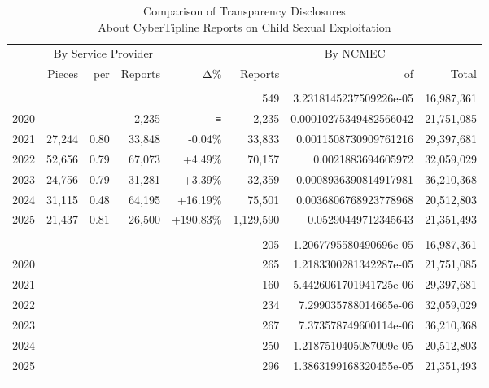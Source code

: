 \begin{table}[!t]
\caption*{
{\large Comparison of Transparency Disclosures} \\
{\small About CyberTipline Reports on Child Sexual Exploitation}
} 

\fontsize{12.0pt}{14.4pt}\selectfont

\begin{tabular*}{\linewidth}{@{\extracolsep{\fill}}l|rrrrrrr}
\toprule
  & \multicolumn{3}{c}{By Service Provider} &  & \multicolumn{3}{c}{By NCMEC} \\ 
\cmidrule(lr){2-4} \cmidrule(lr){6-8}
  & Pieces & per & Reports & Δ\% & Reports & of & Total \\ 
\midrule\addlinespace[2.5pt]
\multicolumn{8}{l}{Amazon} \\[2.5pt] 
\midrule\addlinespace[2.5pt]
2019 &  &  &  &  & 549 & 3.2318145237509226e-05 & 16,987,361 \\
2020 &  &  & 2,235 & ≡ & 2,235 & 0.00010275349482566042 & 21,751,085 \\
2021 & 27,244 & 0.80 & 33,848 & -0.04\% & 33,833 & 0.0011508730909761216 & 29,397,681 \\
2022 & 52,656 & 0.79 & 67,073 & +4.49\% & 70,157 & 0.0021883694605972 & 32,059,029 \\
2023 & 24,756 & 0.79 & 31,281 & +3.39\% & 32,359 & 0.0008936390814917981 & 36,210,368 \\
2024 & 31,115 & 0.48 & 64,195 & +16.19\% & 75,501 & 0.0036806768923778968 & 20,512,803 \\
2025 & 21,437 & 0.81 & 26,500 & +190.83\% & 1,129,590 & 0.05290449712345643 & 21,351,493 \\
\midrule\addlinespace[2.5pt]
\multicolumn{8}{l}{Apple} \\[2.5pt] 
\midrule\addlinespace[2.5pt]
2019 &  &  &  &  & 205 & 1.2067795580490696e-05 & 16,987,361 \\
2020 &  &  &  &  & 265 & 1.2183300281342287e-05 & 21,751,085 \\
2021 &  &  &  &  & 160 & 5.4426061701941725e-06 & 29,397,681 \\
2022 &  &  &  &  & 234 & 7.299035788014665e-06 & 32,059,029 \\
2023 &  &  &  &  & 267 & 7.373578749600114e-06 & 36,210,368 \\
2024 &  &  &  &  & 250 & 1.2187510405087009e-05 & 20,512,803 \\
2025 &  &  &  &  & 296 & 1.3863199168320455e-05 & 21,351,493 \\
\midrule\addlinespace[2.5pt]

\end{tabular*}
\end{table}

